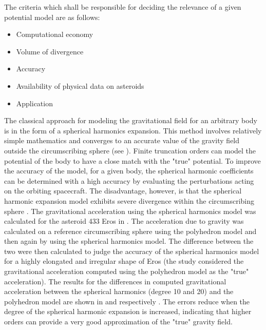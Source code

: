 The criteria which shall be responsible for deciding the relevance of a given potential model are as follows:
\begin{itemize}
\item Computational economy
\item Volume of divergence
\item Accuracy
\item Availability of physical data on asteroids
\item Application
\end{itemize}
%
The classical approach for modeling the gravitational field for an arbitrary body is in the form of a spherical harmonics expansion. This method involves relatively simple mathematics and converges to an accurate value of the gravity field outside the circumscribing sphere (see ). Finite truncation orders can model the potential of the body to have a close match with the "true" potential. To improve the accuracy of the model, for a given body, the spherical harmonic coefficients can be determined with a high accuracy by evaluating the perturbations acting on the orbiting spacecraft. The disadvantage, however, is that the spherical harmonic expansion model exhibits severe divergence within the circumscribing sphere \cite{ellipse_colorado}. The gravitational acceleration using the spherical harmonics model was calculated for the asteroid 433 Eros in \cite{spherical_ellipsoidal_comparison}. The acceleration due to gravity was calculated on a reference circumscribing sphere using the polyhedron model and then again by using the spherical harmonics model. The difference between the two were then calculated to judge the accuracy of the spherical harmonics model for a highly elongated and irregular shape of Eros (the study considered the gravitational acceleration computed using the polyhedron model as the "true" acceleration). The results for the differences in computed gravitational acceleration between the spherical harmonics (degree 10 and 20) and the polyhedron model are shown in  and  respectively \cite{spherical_ellipsoidal_comparison}. The errors reduce when the degree of the spherical harmonic expansion is increased, indicating that higher orders can provide a very good approximation of the "true" gravity field.
%
